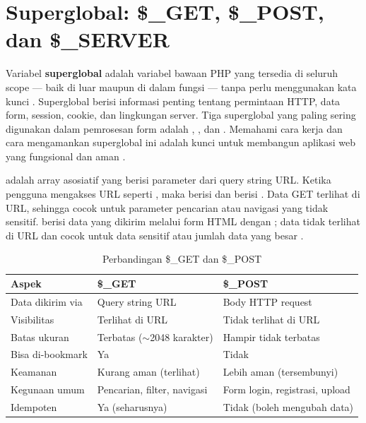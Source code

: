 \section{Superglobal: \$\_GET, \$\_POST, dan \$\_SERVER}

Variabel \textbf{superglobal} adalah variabel bawaan PHP yang tersedia di seluruh scope --- baik di luar maupun di dalam fungsi --- tanpa perlu menggunakan kata kunci . Superglobal berisi informasi penting tentang permintaan HTTP, data form, session, cookie, dan lingkungan server. Tiga superglobal yang paling sering digunakan dalam pemrosesan form adalah , , dan . Memahami cara kerja dan cara mengamankan superglobal ini adalah kunci untuk membangun aplikasi web yang fungsional dan aman \cite{phpManual}.

 adalah array asosiatif yang berisi parameter dari query string URL. Ketika pengguna mengakses URL seperti , maka  berisi  dan  berisi . Data GET terlihat di URL, sehingga cocok untuk parameter pencarian atau navigasi yang tidak sensitif.  berisi data yang dikirim melalui form HTML dengan ; data tidak terlihat di URL dan cocok untuk data sensitif atau jumlah data yang besar \cite{w3schoolsPhp}.

\begin{table}[ht]
\centering
\begin{tabular}{|P{2.5cm}|P{4.5cm}|P{4.5cm}|}
\hline
\textbf{Aspek} & \textbf{\$\_GET} & \textbf{\$\_POST} \\
\hline
Data dikirim via & Query string URL & Body HTTP request \\
\hline
Visibilitas & Terlihat di URL & Tidak terlihat di URL \\
\hline
Batas ukuran & Terbatas ($\sim$2048 karakter) & Hampir tidak terbatas \\
\hline
Bisa di-bookmark & Ya & Tidak \\
\hline
Keamanan & Kurang aman (terlihat) & Lebih aman (tersembunyi) \\
\hline
Kegunaan umum & Pencarian, filter, navigasi & Form login, registrasi, upload \\
\hline
Idempoten & Ya (seharusnya) & Tidak (boleh mengubah data) \\
\hline
\end{tabular}
\caption{Perbandingan \$\_GET dan \$\_POST}
\end{table}

